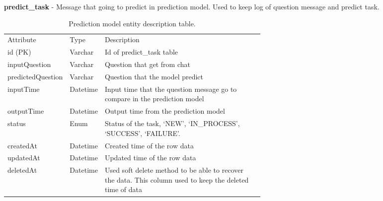 \documentclass[12pt,oneside,openright,a4paper]{cpe-english-project}
\begin{document}
\textbf{predict\_task} - Message that going to predict in prediction model. Used to keep log of question message and predict task.
\begin{table}[ht]
	\caption{Prediction model entity description table.}
	\label{tab:Prediction model entity description table.}
\begin{adjustbox}{width=\textwidth}
\begin{tabular}{llp{0.6\linewidth}l}
\rowcolor[HTML]{5B9BD5} 
Attribute         & Type     & Description                                                                                                 \\
\rowcolor[HTML]{DEEAF6} 
id (PK)           & Varchar  & Id of predict\_task table                                                                                   \\
inputQuestion     & Varchar  & Question that get from chat                                                                            \\
\rowcolor[HTML]{DEEAF6} 
predictedQuestion & Varchar  & Question that the model predict                                                                             \\
inputTime         & Datetime & Input time that the   question message go to compare in the prediction model                                \\
\rowcolor[HTML]{DEEAF6} 
outputTime        & Datetime & Output time from the prediction model                                                                       \\
status            & Enum     & Status of the task,   ‘NEW’, ‘IN\_PROCESS’, ‘SUCCESS’, ‘FAILURE’.                                           \\
\rowcolor[HTML]{DEEAF6} 
createdAt         & Datetime & Created time of the row data                                                                                \\
updatedAt         & Datetime & Updated time of the row   data                                                                              \\
\rowcolor[HTML]{DEEAF6} 
deletedAt         & Datetime & Used soft delete method to be able to recover the data. This column   used to keep the deleted time of data
\end{tabular}
\end{adjustbox}
\end{table}
\end{document}
